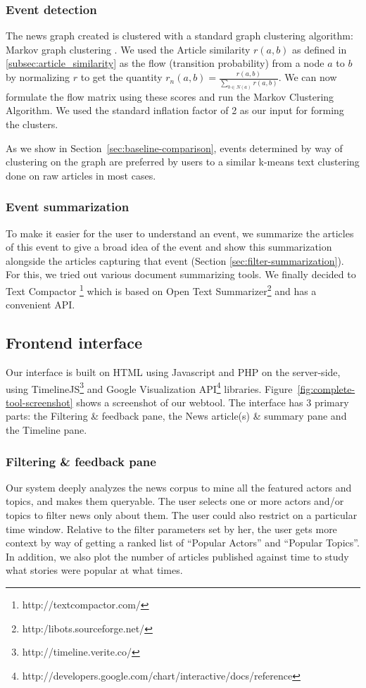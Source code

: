 \subsubsection*{Event detection}
\label{sec:event-detection-summary-context}
The news graph created is clustered with a standard graph clustering algorithm: Markov graph clustering \cite{Dongen00a}.
We used the Article similarity $r(a,b)$ as defined in \ref{subsec:article_similarity} as the flow (transition probability) from a node $a$ to $b$ by normalizing $r$ to get the quantity $r_n(a, b) = \frac{r(a, b)}{\sum_{b \in N(a)}r(a, b)}$. We can now formulate the flow matrix using these scores and run the Markov Clustering Algorithm. We used the standard inflation factor of 2 as our input for forming the clusters. 

As we show in Section~\ref{sec:baseline-comparison}, events determined by way of clustering on the graph are preferred by users to a similar k-means text clustering done on raw articles in most cases.

\subsubsection*{Event summarization}
To make it easier for the user to understand an event, we summarize the articles of this event to give a broad idea of the event and show this summarization alongside the articles capturing that event (Section \ref{sec:filter-summarization}). For this, we tried out various document summarizing tools. We finally decided to Text Compactor \footnote{http://textcompactor.com/} which is based on Open Text Summarizer\footnote{http:/libots.sourceforge.net/} and has a convenient API. 
\subsection {Frontend interface}
Our interface is built on HTML using Javascript and PHP on the server-side, using TimelineJS\footnote{http://timeline.verite.co/} and Google Visualization API\footnote{http://developers.google.com/chart/interactive/docs/reference} libraries.
Figure~\ref{fig:complete-tool-screenshot} shows a screenshot of our webtool. The interface
has 3 primary parts: the Filtering \& feedback pane, the News article(s) \& summary pane and the Timeline pane. 
\subsubsection*{Filtering \& feedback pane}
Our system deeply analyzes the news corpus to mine all the featured actors and topics, and makes them queryable. The user selects one or more actors
and/or topics to filter news only about them. The user could also restrict on a particular time window. Relative to the filter parameters set by her, 
the user gets more context by way of getting a ranked list of ``Popular Actors'' and ``Popular Topics''. In addition, we also plot the number of
articles published against time to study what stories were popular at what times. 
 

